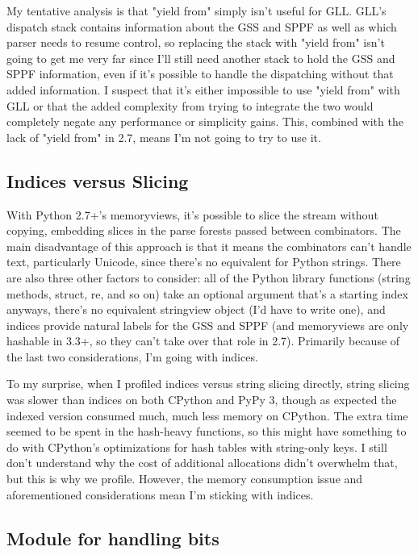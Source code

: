 \documentclass[12pt]{article}
\begin{document}
My tentative analysis is that "yield from" simply isn't useful for
GLL.  GLL's dispatch stack contains information about the GSS and SPPF
as well as which parser needs to resume control, so replacing the
stack with "yield from" isn't going to get me very far since I'll
still need another stack to hold the GSS and SPPF information, even if
it's possible to handle the dispatching without that added
information.  I suspect that it's either impossible to use "yield
from" with GLL or that the added complexity from trying to integrate
the two would completely negate any performance or simplicity gains.
This, combined with the lack of "yield from" in 2.7, means I'm not
going to try to use it.


\subsection{Indices versus Slicing}
\label{sec:indices_slicing}

With Python 2.7+'s memoryviews, it's possible to slice the stream
without copying, embedding slices in the parse forests passed between
combinators.  The main disadvantage of this approach is that it means
the combinators can't handle text, particularly Unicode, since there's
no equivalent for Python strings.  There are also three other factors
to consider: all of the Python library functions (string methods,
struct, re, and so on) take an optional argument that's a starting
index anyways, there's no equivalent stringview object (I'd have to
write one), and indices provide natural labels for the GSS and SPPF
(and memoryviews are only hashable in 3.3+, so they can't take over
that role in 2.7).  Primarily because of the last two considerations,
I'm going with indices.

To my surprise, when I profiled indices versus string slicing
directly, string slicing was slower than indices on both CPython and
PyPy 3, though as expected the indexed version consumed much, much
less memory on CPython.  The extra time seemed to be spent in the
hash-heavy functions, so this might have something to do with
CPython's optimizations for hash tables with string-only keys.  I
still don't understand why the cost of additional allocations didn't
overwhelm that, but this is why we profile.  However, the memory
consumption issue and aforementioned considerations mean I'm sticking
with indices.


\subsection{Module for handling bits}
\label{sec:bits_module}
\end{document}
